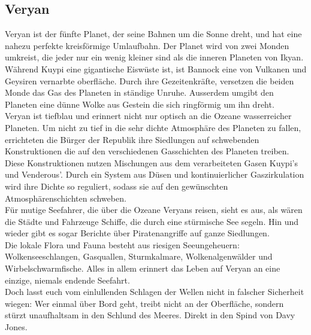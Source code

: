 \documentclass{book}
\begin{document}
    \subsection{Veryan}
        Veryan ist der fünfte Planet, der seine Bahnen um die Sonne dreht, und hat eine nahezu perfekte kreisförmige Umlaufbahn. Der Planet wird von zwei Monden umkreist, die jeder nur ein wenig kleiner sind als die inneren Planeten von Ikyan. Während Kuypi eine gigantische Eiswüste ist, ist Bannock eine von Vulkanen und Geysiren vernarbte oberfläche. Durch ihre Gezeitenkräfte, versetzen die beiden Monde das Gas des Planeten in ständige Unruhe. Ausserdem umgibt den Planeten eine dünne Wolke aus Gestein die sich ringförmig um ihn dreht.\\
        Veryan ist tiefblau und erinnert nicht nur optisch an die Ozeane wasserreicher Planeten. Um nicht zu tief in die sehr dichte Atmosphäre des Planeten zu fallen, errichteten die Bürger der Republik ihre Siedlungen auf schwebenden Konstruktionen die auf den verschiedenen Gasschichten des Planeten treiben.\\
        Diese Konstruktionen nutzen Mischungen aus dem verarbeiteten Gasen Kuypi's und Venderous'. Durch ein System aus Düsen und kontinuierlicher Gaszirkulation wird ihre Dichte so reguliert, sodass sie auf den gewünschten Atmosphärenschichten schweben.\\
        Für mutige Seefahrer, die über die Ozeane Veryans reisen, sieht es aus, als wären die Städte und Fahrzeuge Schiffe, die durch eine stürmische See segeln. Hin und wieder gibt es sogar Berichte über Piratenangriffe auf ganze Siedlungen.\\
        Die lokale Flora und Fauna besteht aus riesigen Seeungeheuern: Wolkenseeschlangen, Gasquallen, Sturmkalmare, Wolkenalgenwälder und Wirbelschwarmfische. Alles in allem erinnert das Leben auf Veryan an eine einzige, niemals endende Seefahrt.\\
        Doch lasst euch vom einlullenden Schlagen der Wellen nicht in falscher Sicherheit wiegen: Wer einmal über Bord geht, treibt nicht an der Oberfläche, sondern stürzt unaufhaltsam in den Schlund des Meeres. Direkt in den Spind von Davy Jones.\\
\end{document}
